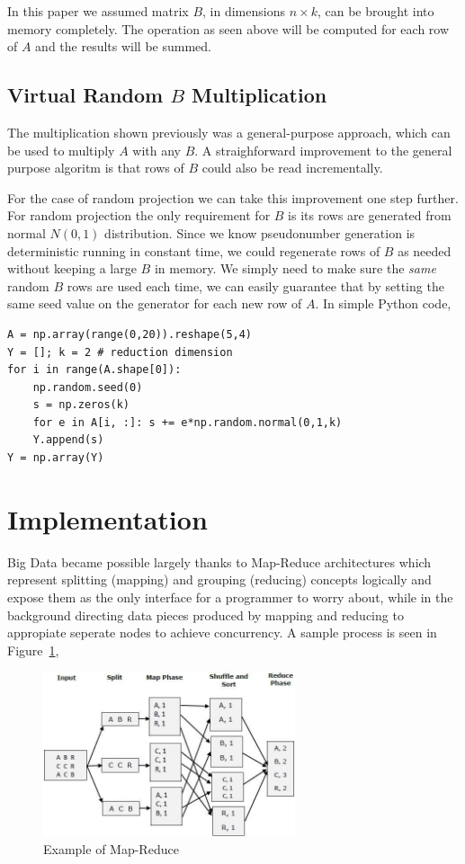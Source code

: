 \documentclass{article}
\begin{document}
In this paper we assumed matrix $B$, in dimensions $n \times k$, can be brought
into memory completely. The operation as seen above will be computed for each
row of $A$ and the results will be summed.

\subsection{Virtual Random $B$ Multiplication}

The multiplication shown previously was a general-purpose approach, which can be
used to multiply $A$ with any $B$. A straighforward improvement to the general
purpose algoritm is that rows of $B$ could also be read incrementally.

For the case of random projection we can take this improvement one step
further. For random projection the only requirement for $B$ is its rows are
generated from normal $N(0,1)$ distribution. Since we know pseudonumber
generation is deterministic running in constant time, we could regenerate rows
of $B$ as needed without keeping a large $B$ in memory. We simply need to make
sure the {\em same} random $B$ rows are used each time, we can easily guarantee
that by setting the same seed value on the generator for each new row of $A$. In
simple Python code,

\begin{verbatim}
A = np.array(range(0,20)).reshape(5,4)
Y = []; k = 2 # reduction dimension
for i in range(A.shape[0]):
    np.random.seed(0)
    s = np.zeros(k)
    for e in A[i, :]: s += e*np.random.normal(0,1,k)
    Y.append(s)
Y = np.array(Y)
\end{verbatim}

\section{Implementation}

Big Data became possible largely thanks to Map-Reduce architectures which
represent splitting (mapping) and grouping (reducing) concepts logically and
expose them as the only interface for a programmer to worry about, while in the
background directing data pieces produced by mapping and reducing to appropiate
seperate nodes to achieve concurrency. A sample process is seen in
Figure~\ref{fig:mapreduce1},

\begin{figure}[h]
  \centering
  \includegraphics[width=20em]{mapreduce1.jpg}
  \caption{Example of Map-Reduce}
  \label{fig:mapreduce1}
\end{figure}
\end{document}
